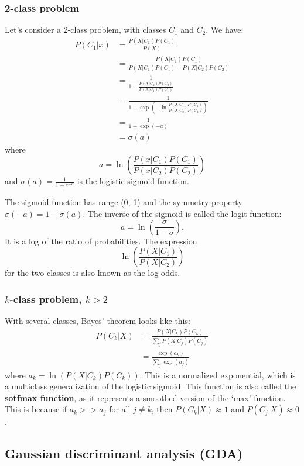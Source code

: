 \documentclass[a4paper,12pt]{article}
\begin{document}
\subsubsection{2-class problem}

Let's consider a 2-class problem, with classes $C_1$ and $C_2$. We have:
\begin{align*}
P(C_1|x) &= \frac{P(X|C_1)P(C_1)}{P(X)}\\
		 &= \frac{P(X|C_1)P(C_1)}{P(X|C_1)P(C_1)+P(X|C_2)P(C_2)}\\
		 &= \frac{1}{1 + \frac{P(X|C_2)P(C_2)}{P(X|C_1)P(C_1)}}\\
		 &= \frac{1}{1 + \exp(-\ln\frac{P(X|C_1)P(C_1)}{P(X|C_2)P(C_2)})}\\
		 &= \frac{1}{1 + \exp(-a)}\\
		 &= \sigma(a)
\end{align*}
where 
$$a = \ln\left(\frac{P(x|C_1)P(C_1)}{P(x|C_2)P(C_2)}\right)$$
and $\sigma(a) = \frac{1}{1+e^{-a}}$ is the logistic sigmoid function. 

The sigmoid function has range (0, 1) and the symmetry property $\sigma(-a) = 1 - \sigma(a)$. The inverse of the sigmoid is called the logit function: 
$$a = \ln\left(\frac{\sigma}{1-\sigma}\right).$$
It is a log of the ratio of probabilities. The expression 
$$\ln\left(\frac{P(X|C_1)}{P(X|C_2)}\right)$$
for the two classes is also known as the log odds. 

\subsubsection{$k$-class problem, $k>2$}

With several classes, Bayes' theorem looks like this: 
\begin{align*}
P(C_k|X) &= \frac{P(X|C_k)P(C_k)}{\sum_j P(X|C_j) P(C_j)} \\
		&= \frac{\exp(a_k)}{\sum_j \exp(a_j)}
\end{align*}
where $a_k = \ln (P(X|C_k)P(C_k))$. This is a normalized exponential, which is a multiclass generalization of the logistic sigmoid. This function is also called the \textbf{sotfmax function}, as it represents a smoothed version of the `max' function. This is because if $a_k >> a_j$ for all $j\neq k$, then $P(C_k|X) \approx 1$ and $P(C_j|X) \approx 0$.  

\subsection{Gaussian discriminant analysis (GDA)}
\end{document}
